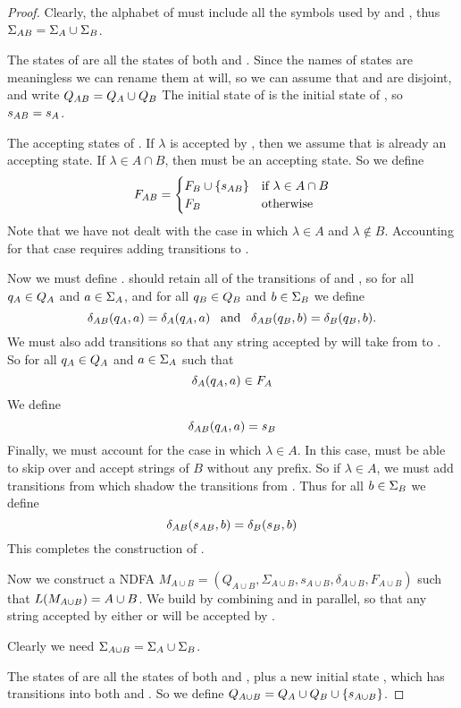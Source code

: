 \documentclass{bcthesis}
\begin{document}
\begin{proof}
		Clearly, the alphabet of \mab must include all the symbols used by \ma and \mb, thus $\Sigma_{AB} = \Sigma_A \cup \Sigma_B$.
		
		The states of \mab are all the states of both \ma and \mb.
		Since the names of states are meaningless we can rename them at will, so we can assume that \qa and \qb are disjoint, and write $Q_{AB} = Q_A \cup Q_B$
		The initial state of \mab is the initial state of \ma, so $s_{AB} = s_A$.

		The accepting states of \mab.
		If $\lambda$ is accepted by \mb, then we assume that \sb is already an accepting state.
		If $\lambda \in A \cap B$, then \sab must be an accepting state.
		So we define
		\[
			F_{AB} = 	\begin{cases}
						F_B \cup \{ s_{AB} \} &\text{if } \lambda \in A \cap B \\
						F_B &\text{otherwise}
					\end{cases}
		\]
		Note that we have not dealt with the case in which $\lambda \in A$ and $\lambda \notin B$.
		Accounting for that case requires adding transitions to \mab.

		Now we must define \dalab.
		\mab should retain all of the transitions of \ma and \mb, so for all $q_A \in Q_A$ and $a \in \Sigma_A$, and for all $q_B \in Q_B$ and $b \in \Sigma_B$ we define
		\[
			\delta_{AB}(q_A, a) = \delta_A(q_A, a) \enspace \text{ and } \enspace \delta_{AB}(q_B, b) = \delta_B(q_B, b).
		\]
		We must also add transitions so that any string accepted by \ma will take \mab from \sab to \sb.
		So for all $q_A \in Q_A$ and $a \in \Sigma_A$ such that 
		\[
			\delta_A(q_A, a) \in F_A
		\]
		We define
		\[
			\delta_{AB}(q_A, a) = s_B
		\]
		Finally, we must account for the case in which $\lambda \in A$.
		In this case, \mab must be able to skip over \ma and accept strings of $B$ without any prefix.
		So if $\lambda \in A$, we must add transitions from \sab which shadow the transitions from \sb.
		Thus for all $b \in \Sigma_B$ we define
		\[
			\delta_{AB}(s_{AB}, b) = \delta_B(s_B, b)
		\]
		This completes the construction of \mab.

		Now we construct a NDFA $M_{A \cup B} = (Q_{A \cup B}, \Sigma_{A \cup B}, s_{A \cup B}, \delta_{A \cup B}, F_{A \cup B})$ such that $L(M_{A \cup B}) = A \cup B$.
		We build \maub by combining \ma and \mb in parallel, so that any string accepted by either \ma or \mb will be accepted by \maub.
		
		Clearly we need $\Sigma_{A \cup B} = \Sigma_A \cup \Sigma_B$.

		The states of \maub are all the states of both \ma and \mb, plus a new initial state \saub, which has transitions into both \ma and \mb.
		So we define $Q_{A \cup B} = Q_A \cup Q_B \cup \{ s_{A \cup B} \}$.


\end{proof}
\end{document}
